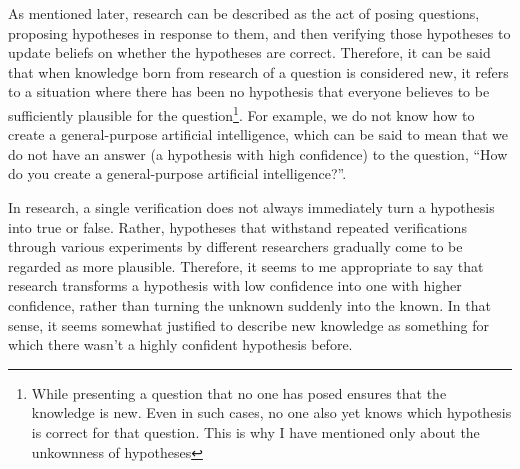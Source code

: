 As mentioned later, research can be described as the act of posing questions, proposing hypotheses in response to them, and then verifying those hypotheses to update beliefs on whether the hypotheses are correct. Therefore, it can be said that when knowledge born from research of a question is considered new, it refers to a situation where there has been no hypothesis that everyone believes to be sufficiently plausible for the question\footnote{
While presenting a question that no one has posed ensures that the knowledge is new. Even in such cases, no one also yet knows which hypothesis is correct for that question. This is why I have mentioned only about the unkownness of hypotheses
}. For example, we do not know how to create a general-purpose artificial intelligence, which can be said to mean that we do not have an answer (a hypothesis with high confidence) to the question, ``How do you create a general-purpose artificial intelligence?''.



In research, a single verification does not always immediately turn a hypothesis into true or false. Rather, hypotheses that withstand repeated verifications through various experiments by different researchers gradually come to be regarded as more plausible. Therefore, it seems to me appropriate to say that research transforms a hypothesis with low confidence into one with higher confidence, rather than turning the unknown suddenly into the known. In that sense, it seems somewhat justified to describe new knowledge as something for which there wasn't a highly confident hypothesis before.


